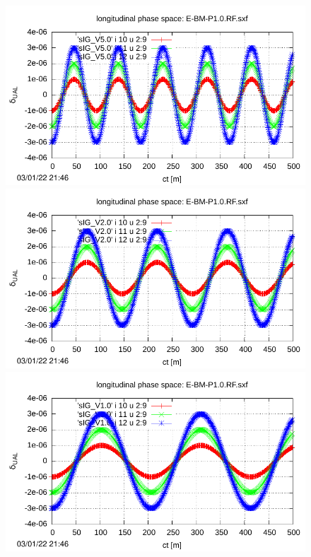 \documentclass[]{article}
\begin{document}
%
\begin{figure}[h]
\begin{minipage}[b]{0.45\linewidth}
\centering
\includegraphics[scale=0.55]{pdf/delta_vs_turn_V5p0.pdf}
\end{minipage}
%
\begin{minipage}[b]{0.45\linewidth}
\centering
\includegraphics[scale=0.55]{pdf/delta_vs_turn_V2p0.pdf}
\end{minipage}
%
%
\begin{minipage}[b]{0.45\linewidth}
\centering
\includegraphics[scale=0.55]{pdf/delta_vs_turn_V1p0.pdf}

\end{minipage}
\end{figure}
\end{document}
